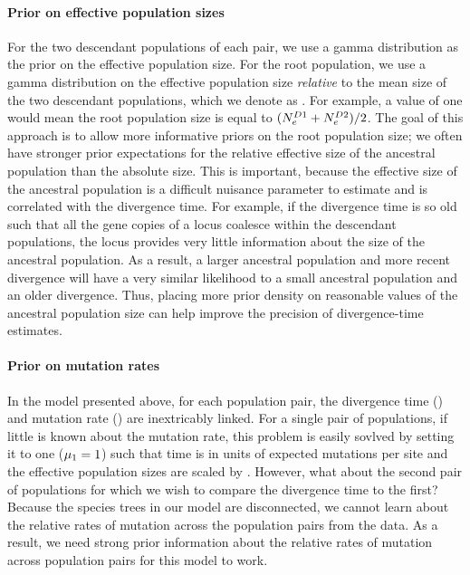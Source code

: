 \paragraph{Prior on effective population sizes}
For the two descendant populations of each pair, we use a gamma distribution as
the prior on the effective population size.
For the root population, we use a gamma distribution on the effective
population size \emph{relative} to the mean size of the two descendant
populations, which we denote as \rootrelativepopsize.
For example, a value of one would mean the root population size is equal to 
$(\epopsize[\descendantpopindex{1}] + \epopsize[\descendantpopindex{2}]) / 2$.
The goal of this approach is to allow more informative priors on the root
population size; we often have stronger prior expectations for the relative
effective size of the ancestral population than the absolute size.
This is important, because the effective size of the ancestral population is a
difficult nuisance parameter to estimate and is correlated with the divergence
time.
For example, if the divergence time is so old such that all the gene copies
of a locus coalesce within the descendant populations, the locus
provides very little information about the size of the ancestral
population.
As a result, a larger ancestral population and more recent divergence will have
a very similar likelihood to a small ancestral population and an older
divergence.
Thus, placing more prior density on reasonable values of the ancestral
population size can help improve the precision of divergence-time estimates.

\paragraph{Prior on mutation rates}
In the model presented above, for each population pair, the divergence time
(\divtime) and mutation rate (\murate) are inextricably linked.
For a single pair of populations, if little is known about the mutation rate,
this problem is easily sovlved by setting it to one ($\murate[1] = 1$) such
that time is in units of expected mutations per site and the effective
population sizes are scaled by \murate.
However, what about the second pair of populations for which we wish to compare
the divergence time to the first?
Because the species trees in our model are disconnected, we cannot learn about
the relative rates of mutation across the population pairs from the data.
As a result, we need strong prior information about the relative rates of
mutation across population pairs for this model to work.

